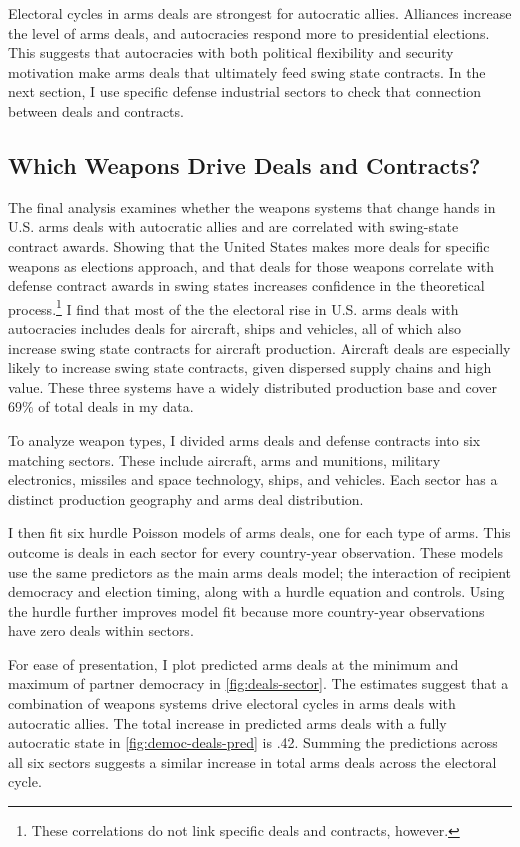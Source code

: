 \documentclass[12pt]{article}
\begin{document}
Electoral cycles in arms deals are strongest for autocratic allies. 
Alliances increase the level of arms deals, and autocracies respond more to presidential elections. 
This suggests that autocracies with both political flexibility and security motivation make arms deals that ultimately feed swing state contracts. 
In the next section, I use specific defense industrial sectors to check that connection between deals and contracts. 



\subsection{Which Weapons Drive Deals and Contracts?} 


The final analysis examines whether the weapons systems that change hands in U.S. arms deals with autocratic allies and are correlated with swing-state contract awards. 
Showing that the United States makes more deals for specific weapons as elections approach, and that deals for those weapons correlate with defense contract awards in swing states increases confidence in the theoretical process.\footnote{These correlations do not link specific deals and contracts, however.}
I find that most of the the electoral rise in U.S. arms deals with autocracies includes deals for aircraft, ships and vehicles, all of which also increase swing state contracts for aircraft production.
Aircraft deals are especially likely to increase swing state contracts, given dispersed supply chains and high value. 
These three systems have a widely distributed production base and cover 69\% of total deals in my data.


To analyze weapon types, I divided arms deals and defense contracts into six matching sectors. 
These include aircraft, arms and munitions, military electronics, missiles and space technology, ships, and vehicles.  
Each sector has a distinct production geography and arms deal distribution.


I then fit six hurdle Poisson models of arms deals, one for each type of arms. 
This outcome is deals in each sector for every country-year observation. 
These models use the same predictors as the main arms deals model; the interaction of recipient democracy and election timing, along with a hurdle equation and controls.
Using the hurdle further improves model fit because more country-year observations have zero deals within sectors. 


For ease of presentation, I plot predicted arms deals at the minimum and maximum of partner democracy in \autoref{fig:deals-sector}.
The estimates suggest that a combination of weapons systems drive electoral cycles in arms deals with autocratic allies.  
The total increase in predicted arms deals with a fully autocratic state in \autoref{fig:democ-deals-pred} is .42. 
Summing the predictions across all six sectors suggests a similar increase in total arms deals across the electoral cycle. 
\end{document}
